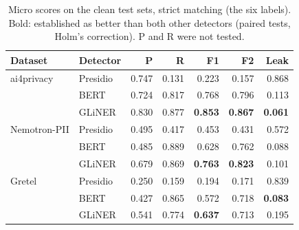 \begin{table}[t]
\centering
\small
\begin{tabular}{llrrrrr}
\toprule
Dataset & Detector & P & R & F1 & F2 & Leak \\
\midrule
ai4privacy & Presidio & 0.747 & 0.131 & 0.223 & 0.157 & 0.868 \\
 & BERT & 0.724 & 0.817 & 0.768 & 0.796 & 0.113 \\
 & GLiNER & 0.830 & 0.877 & \textbf{0.853} & \textbf{0.867} & \textbf{0.061} \\
\midrule
Nemotron-PII & Presidio & 0.495 & 0.417 & 0.453 & 0.431 & 0.572 \\
 & BERT & 0.485 & 0.889 & 0.628 & 0.762 & 0.088 \\
 & GLiNER & 0.679 & 0.869 & \textbf{0.763} & \textbf{0.823} & 0.101 \\
\midrule
Gretel & Presidio & 0.250 & 0.159 & 0.194 & 0.171 & 0.839 \\
 & BERT & 0.427 & 0.865 & 0.572 & 0.718 & \textbf{0.083} \\
 & GLiNER & 0.541 & 0.774 & \textbf{0.637} & 0.713 & 0.195 \\
\bottomrule
\end{tabular}
\caption{Micro scores on the clean test sets, strict matching (the six labels). Bold: established as better than both other detectors (paired tests, Holm's correction). P and R were not tested.}
\label{tab:main}
\end{table}
